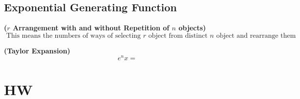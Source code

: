 \documentclass{report}
\begin{document}
\section{Exponential Generating Function}
\begin{theorem}
\textbf{($r$ Arrangement with and without Repetition of $n$ objects)}
\begin{equation*}
\text{ This means the numbers of ways of selecting $r$ object from distinct $n$ object and rearrange them  }
\end{equation*}
\end{theorem}
\begin{theorem}
\textbf{(Taylor Expansion)}
\begin{equation*}
e^nx=
\end{equation*}
\end{theorem}
\chapter{HW}
\end{document}
